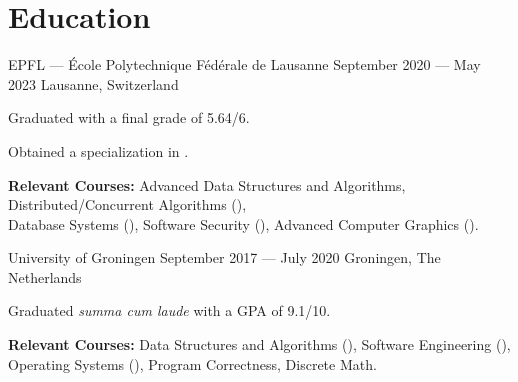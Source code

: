 \section*{Education}

\begin{cventries}
{EPFL --- École Polytechnique Fédérale de Lausanne} %
{September 2020 --- May 2023} %
{Lausanne, Switzerland} %
{%
  \begin{cvitems}
    \item Graduated with a final grade of 5.64/6.
	\item Obtained a specialization in .
	\item \textbf{Relevant Courses:} Advanced Data Structures and Algorithms, Distributed/Concurrent Algorithms (),\\Database Systems (), Software Security (), Advanced Computer Graphics ().
  \end{cvitems}
}
{University of Groningen}  %
{September 2017 --- July 2020} %
{Groningen, The Netherlands} %
{%
  \begin{cvitems}
    \item Graduated \textit{summa cum laude} with a GPA of 9.1/10.
    \item \textbf{Relevant Courses:} Data Structures and Algorithms (), Software Engineering (),\\
		Operating Systems (), Program Correctness,  Discrete Math.
  \end{cvitems}
}
\end{cventries}
